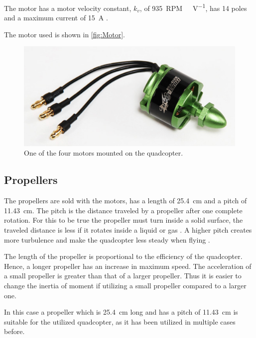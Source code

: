 The motor has a motor velocity constant, $k_v$, of \SI{935}{RPM\ V^{-1}}, has 14 poles and a maximum current of \SI{15}{A} \cite{HkingPropeller}.

The motor used is shown in \autoref{fig:Motor}.
\begin{figure}[H]
	\centering
	\includegraphics[scale=0.5]{figures/motor.png}
	\caption{One of the four motors mounted on the quadcopter.\cite{HkingPropeller}}
	\label{fig:Motor}
\end{figure} 

\subsection{Propellers}
The propellers are sold with the motors, has a length of \SI{25.4}{cm} and a pitch of \SI{11.43}{cm}. The pitch is the distance traveled by a propeller after one complete rotation. For this to be true the propeller must turn inside a solid surface, the traveled distance is less if it rotates inside a liquid or gas \cite{EReyes}. A higher pitch creates more turbulence and make the quadcopter less steady when flying \cite{oscarliang}.

The length of the propeller is proportional to the efficiency of the quadcopter. Hence, a longer propeller has an increase in maximum speed. The acceleration of a small propeller is greater than that of a larger propeller. Thus it is easier to change the inertia of moment if utilizing a small propeller compared to a larger one. \cite{oscarliang}

In this case a propeller which is \SI{25.4}{cm} long and has a pitch of \SI{11.43}{cm} is suitable for the utilized quadcopter, as it has been utilized in multiple cases before. 

